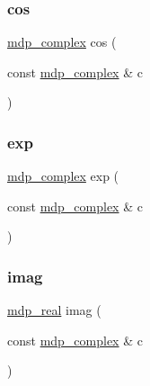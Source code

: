 \mbox{\label{classmdp__complex_a8829f2575ae9740dcf980ca42a9b1076}} 
\subsubsection{\texorpdfstring{cos}{cos}}
{\footnotesize\ttfamily \hyperlink{classmdp__complex}{mdp\+\_\+complex} cos (\begin{DoxyParamCaption}\item[{const \hyperlink{classmdp__complex}{mdp\+\_\+complex} \&}]{c }\end{DoxyParamCaption})\hspace{0.3cm}{\ttfamily [friend]}}

\mbox{\label{classmdp__complex_a0ea103d549cac56c68b3cd38bb9d9ff2}} 
\subsubsection{\texorpdfstring{exp}{exp}}
{\footnotesize\ttfamily \hyperlink{classmdp__complex}{mdp\+\_\+complex} exp (\begin{DoxyParamCaption}\item[{const \hyperlink{classmdp__complex}{mdp\+\_\+complex} \&}]{c }\end{DoxyParamCaption})\hspace{0.3cm}{\ttfamily [friend]}}

\mbox{\label{classmdp__complex_a8a04c5512f11ace74b3f0a259c6be300}} 
\subsubsection{\texorpdfstring{imag}{imag}}
{\footnotesize\ttfamily \hyperlink{mdp__global__vars_8h_a69d96b74c791e0bbdb888b3913a69450}{mdp\+\_\+real} imag (\begin{DoxyParamCaption}\item[{const \hyperlink{classmdp__complex}{mdp\+\_\+complex} \&}]{c }\end{DoxyParamCaption})\hspace{0.3cm}{\ttfamily [friend]}}

